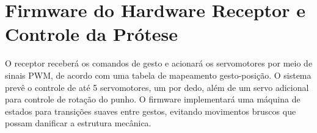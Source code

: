 \section{Firmware do Hardware Receptor e Controle da Prótese}
O receptor receberá os comandos de gesto e acionará os servomotores por meio de sinais PWM, de acordo com uma tabela de mapeamento gesto-posição. O sistema prevê o controle de até 5 servomotores, um por dedo, além de um servo adicional para controle de rotação do punho. O firmware implementará uma máquina de estados para transições suaves entre gestos, evitando movimentos bruscos que possam danificar a estrutura mecânica.